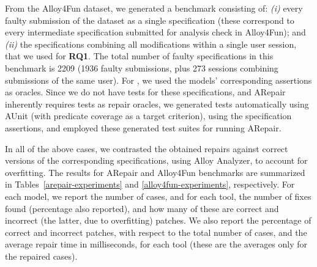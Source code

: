 From the Alloy4Fun dataset, we generated a benchmark consisting of: \emph{(i)} every faulty submission of the dataset as a single specification (these correspond to every intermediate specification submitted for analysis check in Alloy4Fun); and \emph{(ii)} the specifications combining all modifications within a single user session, that we used for \textbf{RQ1}. The total number of faulty specifications in this benchmark is 2209 (1936 faulty submissions, plus 273 sessions combining submissions of the same user). For \technique, we used the models' corresponding assertions as oracles. Since we do not have tests for these specifications, and ARepair inherently requires tests as repair oracles, we generated tests automatically using AUnit \cite{Sullivan+2018} (with predicate coverage as a target criterion), using the specification assertions, and employed these generated test suites for running ARepair. 

In all of the above cases, we contrasted the obtained repairs against correct versions of the corresponding specifications, using Alloy Analyzer, to account for overfitting. The results for ARepair and Alloy4Fun benchmarks are summarized in Tables~\ref{arepair-experiments} and \ref{alloy4fun-experiments}, respectively. For each model, we report the number of cases, and for each tool, the number of fixes found (percentage also reported), and how many of these are correct and incorrect (the latter, due to overfitting) patches. We also report the percentage of correct and incorrect patches, with respect to the total number of cases, and the average repair time in milliseconds, for each tool (these are the averages only for the repaired cases). 




